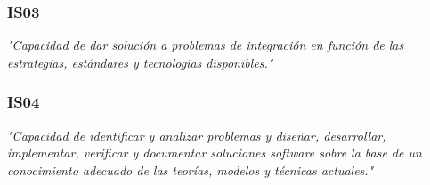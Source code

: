 \subsubsection{IS03}
\textit{"Capacidad de dar solución a problemas de integración en función de las estrategias,
estándares y tecnologías disponibles."}

\subsubsection{IS04}
\textit{"Capacidad de identificar y analizar problemas y diseñar, desarrollar,
implementar, verificar y documentar soluciones software sobre la base de
un conocimiento adecuado de las teorías, modelos y técnicas actuales."}
